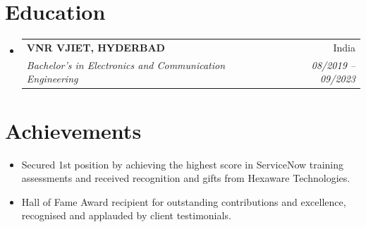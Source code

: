 \documentclass[letterpaper,11pt]{article}
\makeatletter
\newcommand{\resumeItem}[1]{
  \item\small{
    {#1 \vspace{-2pt}}
  }
}
\newcommand{\resumeSubheading}[4]{
  \vspace{-2pt}\item
    \begin{tabular*}{0.97\textwidth}[t]{l@{\extracolsep{\fill}}r}
      \textbf{#1} & #2 \\
      \textit{\small#3} & \textit{\small #4} \\
    \end{tabular*}\vspace{-7pt}
}
\newcommand{\resumeSubHeadingListStart}{\begin{itemize}[leftmargin=0.15in, label={}]}
\newcommand{\resumeSubHeadingListEnd}{\end{itemize}}
\newcommand{\resumeItemListStart}{\begin{itemize}}
\newcommand{\resumeItemListEnd}{\end{itemize}\vspace{-5pt}}
\makeatother
\begin{document}
\section{Education}
\resumeSubHeadingListStart
    \resumeSubheading
        {VNR VJIET, HYDERBAD}{India}
        {Bachelor's in Electronics and Communication Engineering}{08/2019 – 09/2023}
\resumeSubHeadingListEnd
\section{Achievements}
\resumeItemListStart
    \resumeItem{Secured 1st position by achieving the highest score in ServiceNow training assessments and received recognition and gifts from Hexaware Technologies.}
    \resumeItem{Hall of Fame Award recipient for outstanding contributions and excellence, recognised and applauded by client testimonials.}
\resumeItemListEnd
\end{document}

